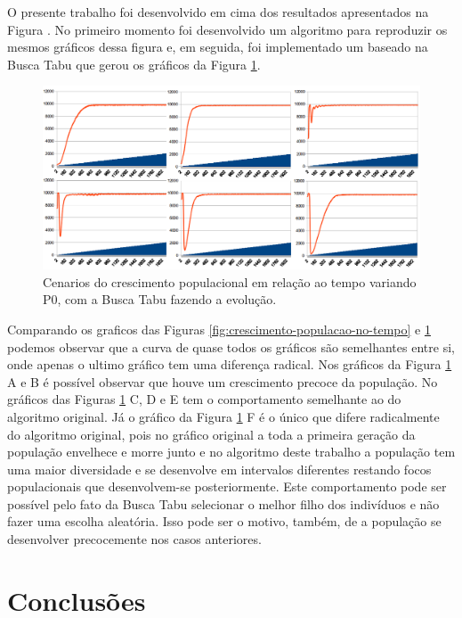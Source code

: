 \documentclass[12pt]{article}
\begin{document}
O presente trabalho foi desenvolvido em cima dos resultados apresentados na
Figura \cite{dzwinel:04}. No primeiro momento foi desenvolvido um algoritmo
para reproduzir os mesmos gráficos dessa figura e, em seguida, foi
implementado um baseado na Busca Tabu que gerou os gráficos da Figura 
\ref{fig:cenarios}.


\begin{figure}[h!]
\centering
\includegraphics[width=.9\textwidth]{imagens/cenarios}
\caption{Cenarios do crescimento populacional em relação ao tempo variando P0,
com a Busca Tabu fazendo a evolução.}
\label{fig:cenarios}
\end{figure}

Comparando os graficos das Figuras \ref{fig:crescimento-populacao-no-tempo} e
\ref{fig:cenarios} podemos observar que a curva de quase todos os gráficos
são semelhantes entre si, onde apenas o ultimo gráfico tem uma diferença 
radical. Nos gráficos da Figura \ref{fig:cenarios} A e B é possível observar
que houve um crescimento precoce da população. No gráficos das Figuras
\ref{fig:cenarios} C, D e E tem o comportamento semelhante ao do algoritmo
original. Já o gráfico da Figura \ref{fig:cenarios} F é o único que difere
radicalmente do algoritmo original, pois no gráfico original a toda a primeira
geração da população envelhece e morre junto e no algoritmo deste trabalho a
população tem uma maior diversidade e se desenvolve em intervalos diferentes
restando focos populacionais que desenvolvem-se posteriormente. Este 
comportamento pode ser possível pelo fato da Busca Tabu selecionar o melhor 
filho dos indivíduos e não fazer uma escolha aleatória. Isso pode ser o motivo, 
também, de a população se desenvolver precocemente nos casos anteriores.


\section{Conclusões}
\end{document}
